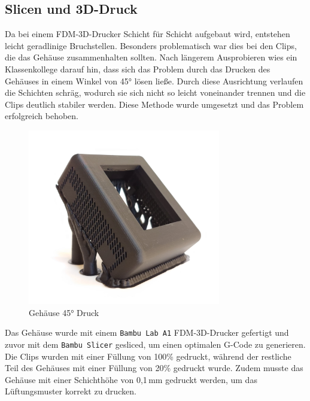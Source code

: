 \begin{inhalt}
\section{Slicen und 3D-Druck}

Da bei einem FDM-3D-Drucker Schicht für Schicht aufgebaut wird, entstehen leicht geradlinige Bruchstellen.  
Besonders problematisch war dies bei den Clips, die das Gehäuse zusammenhalten sollten.  
Nach längerem Ausprobieren wies ein Klassenkollege darauf hin, dass sich das Problem durch das Drucken des Gehäuses in einem Winkel von 45° lösen ließe.  
Durch diese Ausrichtung verlaufen die Schichten schräg, wodurch sie sich nicht so leicht voneinander trennen und die Clips deutlich stabiler werden.  
Diese Methode wurde umgesetzt und das Problem erfolgreich behoben.


\begin{figure}[!htb]
\centering
\includegraphics[width=0.75\textwidth]{files/Thomas/pics/geheause/gehaeuese_45_Grad_druck.png}
\caption[Bildbezeichnung für Abbildungsverzeichnis]{Gehäuse 45° Druck}
\label{fig:gehaeuse_internet_bild}
\end{figure}

Das Gehäuse wurde mit einem \texttt{Bambu Lab A1} FDM-3D-Drucker gefertigt und zuvor mit dem \texttt{Bambu Slicer} gesliced, um einen optimalen G-Code zu generieren.  
Die Clips wurden mit einer Füllung von 100\% gedruckt, während der restliche Teil des Gehäuses mit einer Füllung von 20\% gedruckt wurde.  
Zudem musste das Gehäuse mit einer Schichthöhe von 0{,}1\,mm gedruckt werden, um das Lüftungsmuster korrekt zu drucken.


\end{inhalt}